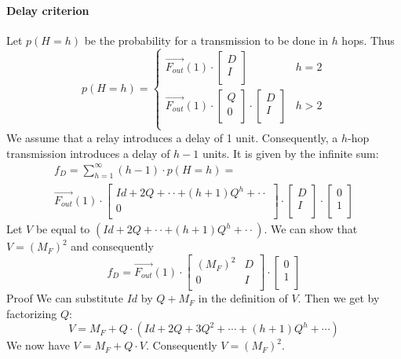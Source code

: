 \documentclass[a4paper]{article}
\newcommand{\Fout}[3]{\overrightarrow{ F_{#1}^{#2}}(#3)}
\newcommand{\Qmatrix}{Q}
\newcommand{\Rmatrix}{D}
\newcommand{\Nmatrix}{M_F}
\begin{document}
{\paragraph{Delay criterion}
Let $p(H=h)$ be the probability for a transmission to be done in $h$ hops. Thus 
\[
p(H=h) = \left\{ 
	\begin{array}{cc}
		\Fout{out}{}{1} \cdot \left[ \begin{array}{c} \Rmatrix \\ I \\ \end{array} \right]  & h=2 \\
		\Fout{out}{}{1} \cdot \left[ \begin{array}{c} \Qmatrix \\ 0 \\ \end{array} \right]  \cdot \left[ \begin{array}{c} \Rmatrix \\ I \\ \end{array} \right]  & h>2 \\		
	\end{array}
\right. 
\]
We assume that a relay introduces a delay of 1 unit. Consequently, a $h$-hop transmission introduces a delay of $h-1$ units.  
It is given by the infinite sum: 
\[
\begin{split}
f_D = \sum_{h=1}^{\infty} (h-1)\cdot p(H=h) = \\
  \Fout{out}{}{1} \cdot 
  \left[ 
	\begin{array}{c}  
  	Id + 2\Qmatrix +  \cdot\cdot + (h+1)\Qmatrix^h + \cdot\cdot \\
  	0 \\
	\end{array}
  \right]	
  \cdot\left[ \begin{array}{c} \Rmatrix \\ I \\ \end{array} \right] \cdot 
 \left[ 
	\begin{array}{c} 
		0  \\ 
		1	 \\ 
	\end{array}
\right]
\end{split}
\]
Let $V$ be equal to $(Id + 2\Qmatrix +\cdot\cdot + (h+1)\Qmatrix^h + \cdot\cdot) $. We can show that $V=(\Nmatrix)^2$ and consequently
\[
f_D = \Fout{out}{}{1} \cdot 
	\left[ \begin{array}{cc} 
		(\Nmatrix)^2 & \Rmatrix \\ 
		0	& 	I \\ 
	\end{array} \right] 
\cdot  \left[ 
	\begin{array}{c} 
		0  \\ 
		1	 \\ 
	\end{array}
\right]
\] 
{\sc Proof}
We can substitute $Id$ by $\Qmatrix + \Nmatrix$ in the definition of $V$. Then we get by factorizing $\Qmatrix$:
\[
V = \Nmatrix + \Qmatrix \cdot(Id + 2\Qmatrix +  3\Qmatrix^2 + \cdots + (h+1)\Qmatrix^h + \cdots ) 
\]
We now have $V=\Nmatrix + \Qmatrix \cdot V$. Consequently $V=(\Nmatrix)^2$.

}
\end{document}

